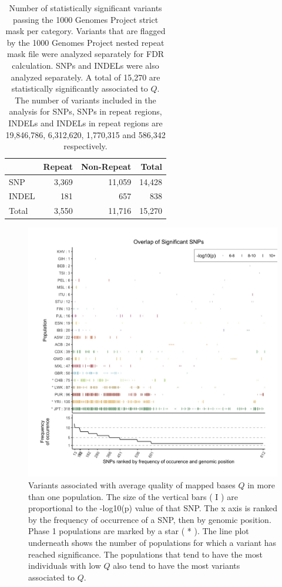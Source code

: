 \documentclass[9pt,lineno]{template}
\begin{document}
\begin{table}[h!]
\centering
\begin{tabular}{l  r r r}
                      & {Repeat}  & {Non-Repeat}   & {Total}    \\ \hline
{SNP}  & 3,369 & 11,059 & 14,428\\  
{INDEL} & 181 & 657 & 838\\ \hline
{Total} & 3,550 & 11,716 & 15,270\\
\end{tabular}
\caption{Number of statistically significant variants  passing the 1000 Genomes Project strict mask per category. 
Variants that are flagged by the 1000 Genomes Project nested repeat mask file were analyzed separately for FDR calculation. SNPs and INDELs were also analyzed separately.
A total of 15,270 are statistically significantly associated to $Q$. 
The number of variants included in the analysis for SNPs, SNPs in repeat regions, INDELs and INDELs in repeat regions are  19,846,786, 6,312,620, 1,770,315 and 586,342 respectively.}
\label{sigTable}
\end{table}

\begin{figure}
\includegraphics[width=\hsize,keepaspectratio]{../Figures/SNPOverlap6.jpg}

\caption{Variants associated with average quality of mapped bases $Q$ in more than one population.
The size of the vertical bars ( I ) are proportional to the -log10(p) value of that SNP.
The x axis is ranked by the frequency of occurrence of a SNP, then by genomic position.
Phase 1 populations are marked by a star ( * ).
The line plot underneath shows the number of populations for which a variant has reached significance.
The populations that tend to have the most individuals with low $Q$ also tend to have the most variants associated to $Q$.}
  \label{OverLap}
\end{figure}
\end{document}
